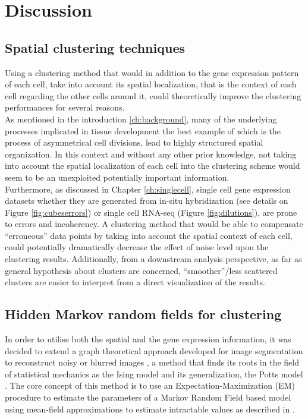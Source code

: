\section{Discussion}
	\subsection{Spatial clustering techniques}
	Using a clustering method that would in addition to the gene expression pattern of each cell, take into account its spatial localization, that is the context of each cell regarding the other cells around it, could theoretically improve the clustering performances for several reasons.\\
	
	As mentioned in the introduction \ref{ch:background}, many of the underlying processes implicated in tissue development the best example of which is the process of asymmetrical cell divisions, lead to highly structured spatial organization. In this context and without any other prior knowledge, not taking into account the spatial localization of each cell into the clustering scheme would seem to be an unexploited potentially important information. \\
	
	Furthermore, as discussed in Chapter \ref{ch:singlecell}, single cell gene expression datasets whether they are generated from in-situ hybridization (see details on Figure \ref{fig:cubeserrors}) or single cell RNA-seq (Figure \ref{fig:dilutions}), are prone to errors and incoherency. A clustering method that would be able to compensate ``erroneous'' data points by taking into account the spatial context of each cell, could potentially dramatically decrease the effect of noise level upon the clustering results. Additionally, from a downstream analysis perspective, as far as general hypothesis about clusters are concerned, ``smoother''/less scattered clusters are easier to interpret from a direct visualization of the results.\\


	\subsection{Hidden Markov random fields for clustering}
In order to utilise both the spatial and the gene expression information, it was decided to extend a graph theoretical approach developed for image segmentation to reconstruct noisy or blurred images \cite{Dang98}, a method that finds its roots in the field of statistical mechanics as the Ising model \cite{Ising25} and its generalization, the Potts model \cite{Wu82}. The core concept of this method is to use an Expectation-Maximization (EM) procedure to estimate the parameters of a Markov Random Field based model using mean-field approximations to estimate intractable values as described in \cite{Celeux01}.\\

